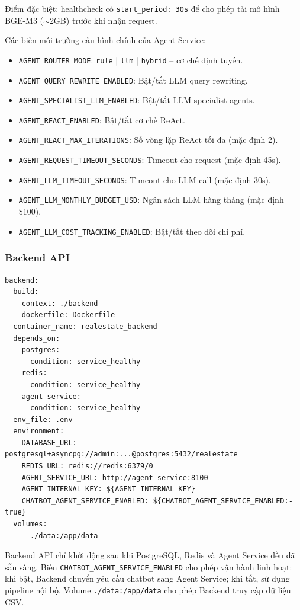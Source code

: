 Điểm đặc biệt: healthcheck có \texttt{start\_period: 30s} để cho phép tải mô hình BGE-M3 ($\sim$2GB) trước khi nhận request.

Các biến môi trường cấu hình chính của Agent Service:
\begin{itemize}
    \item \texttt{AGENT\_ROUTER\_MODE}: \texttt{rule} | \texttt{llm} | \texttt{hybrid} -- cơ chế định tuyến.
    \item \texttt{AGENT\_QUERY\_REWRITE\_ENABLED}: Bật/tắt LLM query rewriting.
    \item \texttt{AGENT\_SPECIALIST\_LLM\_ENABLED}: Bật/tắt LLM specialist agents.
    \item \texttt{AGENT\_REACT\_ENABLED}: Bật/tắt cơ chế ReAct.
    \item \texttt{AGENT\_REACT\_MAX\_ITERATIONS}: Số vòng lặp ReAct tối đa (mặc định 2).
    \item \texttt{AGENT\_REQUEST\_TIMEOUT\_SECONDS}: Timeout cho request (mặc định 45s).
    \item \texttt{AGENT\_LLM\_TIMEOUT\_SECONDS}: Timeout cho LLM call (mặc định 30s).
    \item \texttt{AGENT\_LLM\_MONTHLY\_BUDGET\_USD}: Ngân sách LLM hàng tháng (mặc định \$100).
    \item \texttt{AGENT\_LLM\_COST\_TRACKING\_ENABLED}: Bật/tắt theo dõi chi phí.
\end{itemize}

\subsubsection{Backend API}

\begin{verbatim}
backend:
  build:
    context: ./backend
    dockerfile: Dockerfile
  container_name: realestate_backend
  depends_on:
    postgres:
      condition: service_healthy
    redis:
      condition: service_healthy
    agent-service:
      condition: service_healthy
  env_file: .env
  environment:
    DATABASE_URL: postgresql+asyncpg://admin:...@postgres:5432/realestate
    REDIS_URL: redis://redis:6379/0
    AGENT_SERVICE_URL: http://agent-service:8100
    AGENT_INTERNAL_KEY: ${AGENT_INTERNAL_KEY}
    CHATBOT_AGENT_SERVICE_ENABLED: ${CHATBOT_AGENT_SERVICE_ENABLED:-true}
  volumes:
    - ./data:/app/data
\end{verbatim}

Backend API chỉ khởi động sau khi PostgreSQL, Redis và Agent Service đều đã sẵn sàng. Biến \texttt{CHATBOT\_AGENT\_SERVICE\_ENABLED} cho phép vận hành linh hoạt: khi bật, Backend chuyển yêu cầu chatbot sang Agent Service; khi tắt, sử dụng pipeline nội bộ. Volume \texttt{./data:/app/data} cho phép Backend truy cập dữ liệu CSV.

